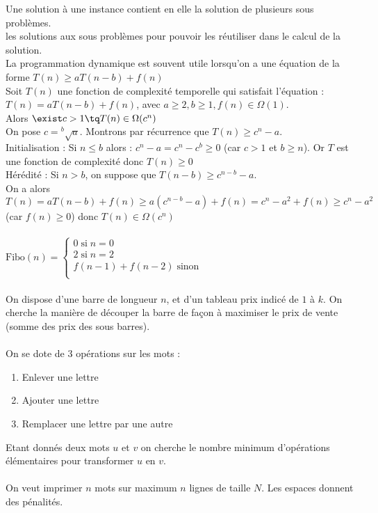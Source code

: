  Une solution à une instance contient en elle la solution de plusieurs sous problèmes. \\

 les solutions aux sous problèmes pour pouvoir les réutiliser dans le calcul de la solution. \\

 La programmation dynamique est souvent utile lorsqu'on a une équation de la forme $T(n) \geq aT(n-b) + f(n)$ \\

 Soit $T(n)$ une fonction de complexité temporelle qui satisfait l'équation : \\ $T(n) = aT(n-b) + f(n)$, avec $a\geq 2, b\geq 1, f(n) \in \Omega(1)$. \\ Alors $\exist c > 1 \tq T(n) \in \Omega(c^n)$\\

 On pose $c = \displaystyle{^b\sqrt{a}}$. Montrons par récurrence que $T(n) \geq c^n-a$. \\
Initialisation : Si $n\leq b$ alors : $c^n - a = c^n - c^b \geq 0$ (car $c>1$ et $b \geq n$). Or $T$ est une fonction de complexité donc $T(n)\geq 0$ \\
Hérédité : Si $n>b$, on suppose que $T(n-b) \geq c^{n-b}-a$. \\
On a alors $T(n) = aT(n-b) + f(n) \geq a(c^{n-b} - a) + f(n) = c^n - a^2 + f(n) \geq c^n - a^2$ (car $f(n) \geq 0$) donc $T(n) \in \Omega(c^n)$\\
\newpage
{} \\
$\mathrm{Fibo}(n) = \left\{ \begin{array}{ll} 0 \; \mathrm{si} \; n=0 \\ 2 \; \mathrm{si} \; n=2 \\ f(n-1)+f(n-2) \; \mathrm{sinon} \\ \end{array} \right.$\\

 \\ On dispose d'une barre de longueur $n$, et d'un tableau prix indicé de $1$ à $k$. On cherche la manière de découper la barre de façon à maximiser le prix de vente (somme des prix des sous barres). \\

 \\
On se dote de 3 opérations sur les mots : 
\begin{enumerate}
	\item Enlever une lettre
	\item Ajouter une lettre
	\item Remplacer une lettre par une autre
\end{enumerate}
Etant donnés deux mots $u$ et $v$ on cherche le nombre minimum d'opérations élémentaires pour transformer $u$ en $v$. \\

 \\
On veut imprimer $n$ mots sur maximum $n$ lignes de taille $N$. Les espaces donnent des pénalités. \\
